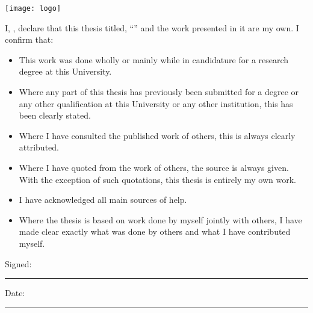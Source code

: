 \documentclass[
12pt, %
oneside, %
english, %
onehalfspacing, %
onehalfspacing, %
headsepline, %
]{MastersDoctoralThesis} %
\begin{document}
\begin{titlepage}
\begin{center}
\renewcommand\floatpagefraction{0.1}

\texttt{[image: logo]} %
 
\end{center}
\end{titlepage}


\begin{declaration}
\addchaptertocentry{\authorshipname} %
\noindent I, \authorname, declare that this thesis titled, \enquote{\ttitle} and the work presented in it are my own. I confirm that:

\begin{itemize} 
\item This work was done wholly or mainly while in candidature for a research degree at this University.
\item Where any part of this thesis has previously been submitted for a degree or any other qualification at this University or any other institution, this has been clearly stated.
\item Where I have consulted the published work of others, this is always clearly attributed.
\item Where I have quoted from the work of others, the source is always given. With the exception of such quotations, this thesis is entirely my own work.
\item I have acknowledged all main sources of help.
\item Where the thesis is based on work done by myself jointly with others, I have made clear exactly what was done by others and what I have contributed myself.\\
\end{itemize}
 
\noindent Signed:\\
\rule[0.5em]{25em}{0.5pt} %
 
\noindent Date:\\
\rule[0.5em]{25em}{0.5pt} %
\end{declaration}

\cleardoublepage
\end{document}
